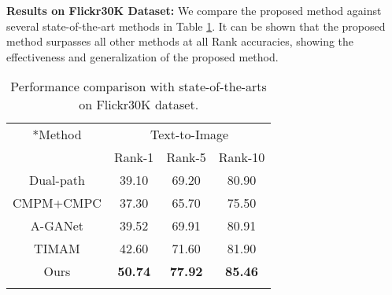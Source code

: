 \documentclass{article}
\begin{document}
\par
\textbf{Results on Flickr30K Dataset: } We compare the proposed method against several state-of-the-art methods in Table \ref{tab2}. It can be shown that the proposed method surpasses all other methods at all Rank accuracies, showing the effectiveness and generalization of the proposed method.
\begin{table}

\setlength{\abovecaptionskip}{0.5cm}
\begin{center}
\caption{Performance comparison with state-of-the-arts on Flickr30K dataset.}
\label{tab2}
\vspace{-1em}
\begin{tabular}{c|c|c|c}
\Xhline{1.2pt}
\multirow{2}*{Method} & \multicolumn{3}{c}{Text-to-Image} \\
\cline{2-4}
& Rank-1 & Rank-5 & Rank-10 \\

\hline
Dual-path \cite{zheng2020dual} & 39.10 & 69.20 & 80.90 \\
CMPM+CMPC \cite{zhang2018deep} & 37.30 & 65.70 & 75.50 \\
A-GANet \cite{10.1145/3343031.3350991} &39.52 & 69.91 & 80.91 \\
TIMAM \cite{zha2020adversarial}& 42.60 & 71.60 & 81.90 \\
\hline
Ours &\textbf{ 50.74} & \textbf{77.92} & \textbf{85.46} \\
\Xhline{1.2pt}
\end{tabular}
\end{center}
\vspace{-2em}
\end{table}


\par
\end{document}
